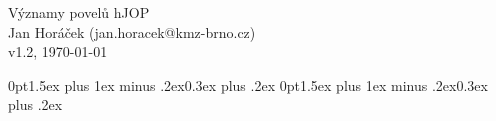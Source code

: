 \documentclass[12pt,a4paper,landscape]{article}
\begin{document}
\pagestyle{empty}

\begin{center}
\huge Významy povelů hJOP\\
\normalsize Jan Horáček (jan.horacek@kmz-brno.cz)\\
v1.2, \today
\end{center}

\titlespacing*{\section} {0pt}{1.5ex plus 1ex minus .2ex}{0.3ex plus .2ex}
\titlespacing*{\subsection} {0pt}{1.5ex plus 1ex minus .2ex}{0.3ex plus .2ex}

\end{document}
